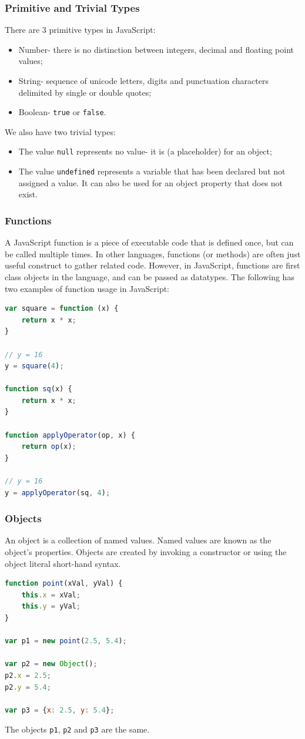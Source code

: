 \documentclass[a4paper, openany]{memoir}
\begin{document}
\subsubsection{Primitive and Trivial Types}
There are 3 primitive types in JavaScript:
\begin{itemize}
    \item Number- there is no distinction between integers, decimal and floating point values;
    \item String- sequence of unicode letters, digits and punctuation characters delimited by single or double quotes;
    \item Boolean- \texttt{true} or \texttt{false}.
\end{itemize}
We also have two trivial types:
\begin{itemize}
    \item The value \texttt{null} represents no value- it is (a placeholder) for an object;
    \item The value \texttt{undefined} represents a variable that has been declared but not assigned a value. It can also be used for an object property that does not exist.
\end{itemize}

\subsubsection{Functions}
A JavaScript function is a piece of executable code that is defined once, but can be called multiple times. In other languages, functions (or methods) are often just useful construct to gather related code. However, in JavaScript, functions are first class objects in the language, and can be passed as datatypes. The following has two examples of function usage in JavaScript:
\begin{lstlisting}[language=javascript]
var square = function (x) {
    return x * x;
}

// y = 16
y = square(4);

function sq(x) {
    return x * x;
}

function applyOperator(op, x) {
    return op(x);
}

// y = 16
y = applyOperator(sq, 4);
\end{lstlisting}

\subsubsection{Objects}
An object is a collection of named values. Named values are known as the object's properties. Objects are created by invoking a constructor or using the object literal short-hand syntax.
\begin{lstlisting}[language=javascript]
function point(xVal, yVal) {
    this.x = xVal;
    this.y = yVal;
}

var p1 = new point(2.5, 5.4);

var p2 = new Object();
p2.x = 2.5;
p2.y = 5.4;

var p3 = {x: 2.5, y: 5.4};
\end{lstlisting}
The objects \texttt{p1}, \texttt{p2} and \texttt{p3} are the same.
\end{document}
